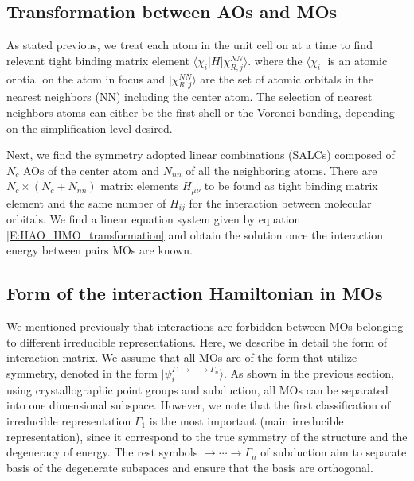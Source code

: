 \documentclass{article}
\begin{document}
\subsection{Transformation between AOs and MOs}
As stated previous, we treat each atom in the unit cell on at a time to find relevant tight binding matrix element $\langle \chi_{i} | H | \chi^{NN}_{R,j} \rangle$.
where the $\langle \chi_{i} |$ is an atomic orbtial on the atom in focus and $| \chi^{NN}_{R,j} \rangle$ are the set of atomic orbitals in the nearest neighbors (NN)
including the center atom. 
The selection of nearest neighbors atoms can either be the first shell or the Voronoi bonding, depending on the simplification level desired. 

Next, we find the symmetry adopted linear combinations (SALCs) composed of $N_c$ AOs of the center atom and $N_{nn}$ of all the neighboring atoms. 
There are $N_c\times (N_c + N_{nn})$ matrix elements $H_{\mu\nu}$ to be found as tight binding matrix element and the same number of $H_{ij}$ for 
the interaction between molecular orbitals. We find a linear equation system given by equation \eqref{E:HAO_HMO_transformation} and 
obtain the solution once the interaction energy between pairs MOs are known.

\subsection{Form of the interaction Hamiltonian in MOs}
We mentioned previously that interactions are forbidden between MOs belonging to different 
irreducible representations. Here, we describe in detail the form of interaction matrix. 
We assume that all MOs are of the form that utilize symmetry, denoted in the form 
$|\psi_i^{\Gamma_1\to \cdots \to \Gamma_n} \rangle$. As shown in the previous section, using crystallographic 
point groups and subduction, all MOs can be separated into one dimensional subspace. However, we note that 
the first classification of irreducible representation $\Gamma_1$ is the most important (main irreducible representation), since it correspond
to the true symmetry of the structure and the degeneracy of energy. 
The rest symbols $\to \cdots \to \Gamma_n$ of subduction aim to separate basis of the degenerate subspaces and 
ensure that the basis are orthogonal. 
\end{document}
